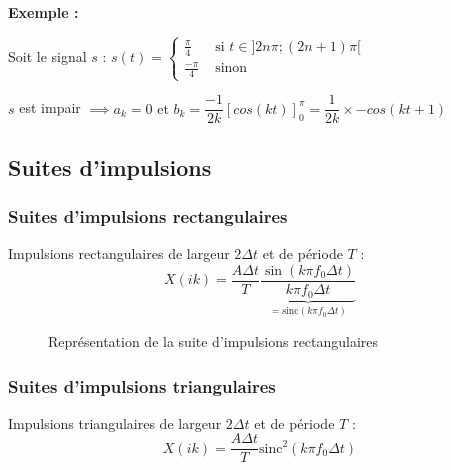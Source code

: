 \documentclass[a4paper,12pt]{report}
\begin{document}
\textbf{Exemple :}

Soit le signal $s$ : $s(t) =
\begin{cases}
    \frac{\pi}{4} & \text{ si } t \in ] 2n\pi ; (2n+1)\pi [ \\
    \frac{-\pi}{4} & \text{ sinon}
\end{cases}$

$s$ est impair $\implies a_k = 0 \text{ et } b_k = \dfrac{-1}{2k} [cos(kt)]_{0}^{\pi} = \dfrac{1}{2k} \times -cos(kt+1)$

\subsection{Suites d'impulsions}

\subsubsection{Suites d'impulsions rectangulaires}

Impulsions rectangulaires de largeur $2\Delta t$ et de période $T$ :
\[ X(ik) = \dfrac{A\Delta t}{T} \underbrace{\dfrac{\sin(k\pi f_0 \Delta t)}{k\pi f_0 \Delta t}}_{=\mathrm{sinc}(k\pi f_0 \Delta t)} \]

\begin{figure}[!htbp]
	\centering
	\caption{Représentation de la suite d'impulsions rectangulaires}
\end{figure}

\subsubsection{Suites d'impulsions triangulaires}

Impulsions triangulaires de largeur $2\Delta t$ et de période $T$ :
\[ X(ik) = \dfrac{A\Delta t}{T} \mathrm{sinc}^2(k\pi f_0 \Delta t) \]
\end{document}
